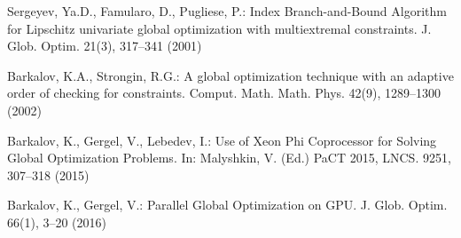 \documentclass{llncs}
\begin{document}
\begin{thebibliography}{99}
Sergeyev, Ya.D., Famularo, D., Pugliese, P.: Index Branch-and-Bound Algorithm for Lipschitz univariate global optimization with multiextremal constraints. J. Glob. Optim. 21(3), 317--341 (2001)

Barkalov, K.A., Strongin, R.G.: A global optimization technique with an adaptive order of checking for constraints. Comput. Math. Math. Phys. 42(9), 1289--1300 (2002)




Barkalov, K., Gergel, V., Lebedev, I.: Use of Xeon Phi Coprocessor for Solving Global Optimization Problems. In: Malyshkin, V. (Ed.) PaCT 2015, LNCS. 9251, 307--318 (2015)

Barkalov, K., Gergel, V.: Parallel Global Optimization on GPU. J. Glob. Optim. 66(1), 3--20 (2016)


                                                                           
\end{thebibliography}
\end{document}

